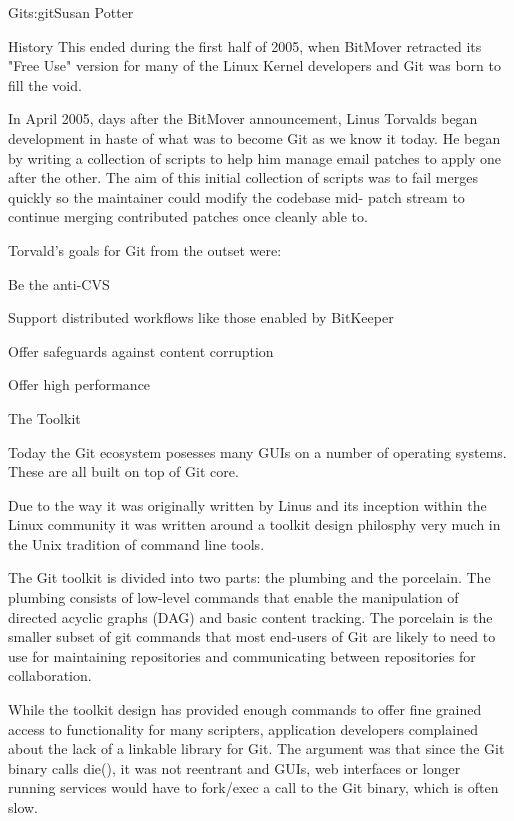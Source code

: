 \begin{aosachapter}{Git}{s:git}{Susan Potter}
\begin{aosasect1}{History}
This ended during the first half of 2005, when BitMover retracted its
"Free Use" version for many of the Linux Kernel developers and Git was born
to fill the void.

In April 2005, days after the BitMover announcement, Linus Torvalds began
development in haste of what was to become Git as we know it today. He began
by writing a collection of scripts to help him manage email patches
to apply one after the other. The aim of this initial collection of scripts
was to fail merges quickly so the maintainer could modify the codebase mid-
patch stream to continue merging contributed patches once cleanly able to.

Torvald's goals for Git from the outset were:
\begin{aosaitemize}
  \item Be the anti-CVS
  \item Support distributed workflows like those enabled by BitKeeper
  \item Offer safeguards against content corruption
  \item Offer high performance
\end{aosaitemize}

\end{aosasect1}

\begin{aosasect1}{The Toolkit}

Today the Git ecosystem posesses many GUIs on a number of operating systems.
These are all built on top of Git core.

Due to the way it was originally written by Linus and its inception within
the Linux community it was written around
a toolkit design philosphy very much in the Unix tradition of command line
tools.

The Git toolkit is divided into two parts: the plumbing and
the porcelain. The plumbing consists of low-level commands that enable
the manipulation of directed acyclic graphs (DAG) and basic content
tracking. The porcelain is the smaller subset of git commands that most
end-users of Git are likely to need to use for maintaining repositories and
communicating between repositories for collaboration.

While the toolkit design has provided enough commands to offer
fine grained access to functionality for many scripters, application developers
complained about the lack of a linkable library for Git. The argument was
that since the Git binary calls die(), it was not
reentrant and GUIs, web interfaces or longer running services would have
to fork/exec a call to the Git binary, which is often slow.


\end{aosasect1}
\end{aosachapter}
